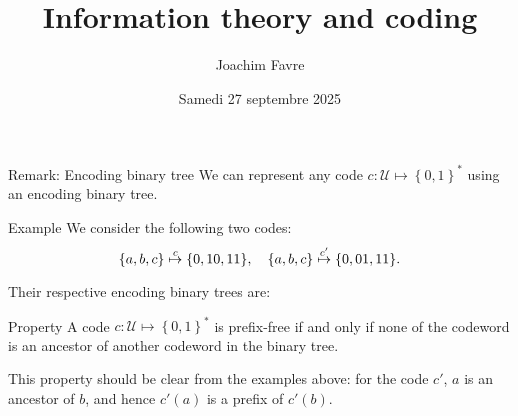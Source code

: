 \documentclass[a4paper]{article}
\title{Information theory and coding}
\author{Joachim Favre}
\date{Samedi 27 septembre 2025}
\begin{document}
\maketitle


\begin{parag}{Remark: Encoding binary tree}
    We can represent any code $c: \mathcal{U} \mapsto \left\{0, 1\right\}^*$ using an encoding binary tree.

    \begin{subparag}{Example}
        We consider the following two codes:
        \[\left\{a, b, c\right\} \over{\mapsto}{$c$}  \left\{0, 10, 11\right\}, \mathspace \left\{a, b, c\right\} \over{\mapsto}{$c'$}  \left\{0, 01, 11\right\}.\]

        Their respective encoding binary trees are:
    \end{subparag}

    \begin{subparag}{Property}
        A code $c: \mathcal{U} \mapsto \left\{0, 1\right\}^*$ is prefix-free if and only if none of the codeword is an ancestor of another codeword in the binary tree.

        This property should be clear from the examples above: for the code $c'$, $a$ is an ancestor of $b$, and hence $c'\left(a\right)$ is a prefix of $c'\left(b\right)$.
    \end{subparag}
\end{parag}
\end{document}
